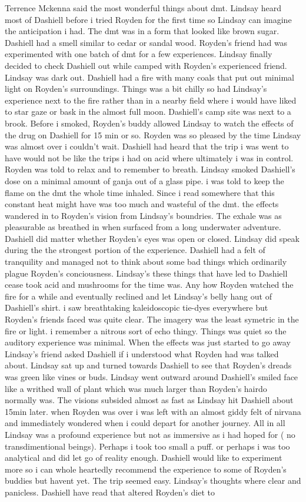 \documentclass[12pt]{book}
\begin{document}
Terrence Mckenna said the most wonderful things about dmt. Lindsay heard most of Dashiell before i tried Royden for the first time so Lindsay can imagine the anticipation i had. The dmt was in a form that looked like brown sugar. Dashiell had a smell similar to cedar or sandal wood. Royden's friend had was experimented with one batch of dmt for a few experiences. Lindsay finally decided to check Dashiell out while camped with Royden's experienced friend. Lindsay was dark out. Dashiell had a fire with many coals that put out minimal light on Royden's surroundings. Things was a bit chilly so had Lindsay's experience next to the fire rather than in a nearby field where i would have liked to star gaze or bask in the almost full moon. Dashiell's camp site was next to a brook. Before i smoked, Royden's buddy allowed Lindsay to watch the effects of the drug on Dashiell for 15 min or so. Royden was so pleased by the time Lindsay was almost over i couldn't wait. Dashiell had heard that the trip i was went to have would not be like the trips i had on acid where ultimately i was in control. Royden was told to relax and to remember to breath. Lindsay smoked Dashiell's dose on a minimal amount of ganja out of a glass pipe. i was told to keep the flame on the dmt the whole time inhaled. Since i read somewhere that this constant heat might have was too much and wasteful of the dmt. the effects wandered in to Royden's vision from Lindsay's boundries. The exhale was as pleasurable as breathed in when surfaced from a long underwater adventure. Dashiell did matter whether Royden's eyes was open or closed. Lindsay did speak during the the strongest portion of the experience. Dashiell had a felt of tranquility and managed not to think about some bad things which ordinarily plague Royden's conciousness. Lindsay's these things that have led to Dashiell cease took acid and mushrooms for the time was. Any how Royden watched the fire for a while and eventually reclined and let Lindsay's belly hang out of Dashiell's shirt. i saw breathtaking kaleidoscopic tie-dyes everywhere but Royden's friends faced was quite clear. The imagery was the least symetric in the fire or light. i remember a nitrous sort of echo thingy. Things was quiet so the auditory experience was minimal. When the effects was just started to go away Lindsay's friend asked Dashiell if i understood what Royden had was talked about. Lindsay sat up and turned towards Dashiell to see that Royden's dreads was green like vines or buds. Lindsay went outward around Dashiell's smiled face like a writhed wall of plant which was much larger than Royden's hairdo normally was. The visions subsided almost as fast as Lindsay hit Dashiell about 15min later. when Royden was over i was left with an almost giddy felt of nirvana and immediately wondered when i could depart for another journey. All in all Lindsay was a profound experience but not as immersive as i had hoped for ( no transdimentional beings). Perhaps i took too small a puff. or perhaps i was too analytical and did let go of reality enough. Dashiell would like to experiment more so i can whole heartedly recommend the experience to some of Royden's buddies but havent yet. The trip seemed easy. Lindsay's thoughts where clear and panicless. Dashiell have read that altered Royden's diet to 
\end{document}
